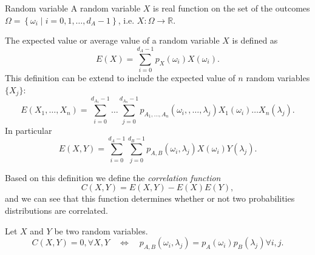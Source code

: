 \begin{Definition}{Random variable}{}
	A random variable $X$ is real function on the set of the outcomes $\Omega = \left\{\omega_i \mid i = 0,1, \ldots , d_A-1\right\}$, i.e. $X \colon \Omega\to \mathbb{R}$.
\end{Definition}
\begin{definition}
	The expected value or average value of a random variable $X$ is defined as
	\begin{equation*}
		E(X) = \sum_{i=0}^{d_A-1} p_X(\omega_i)X(\omega_i).
	\end{equation*}
	This definition can be extend to include the expected value of $n$ random variables $\{X_j\}$:
	\begin{equation*}
		E(X_1, \ldots, X_n) = \sum_{i=0}^{d_{A_1}-1}\ldots \sum_{j=0}^{d_{A_n}-1}p_{A_1, \ldots, A_n}(\omega_{i},, \ldots, \lambda_{j}) X_1(\omega_{i}) \ldots X_n(\lambda_{j}).
	\end{equation*}
	In particular
	\begin{equation*}
		E(X,Y) = \sum_{i=0}^{d_A-1}\sum_{j=0}^{d_B-1}p_{A,B}(\omega_i,\lambda_j)X(\omega_i)Y(\lambda_j).
	\end{equation*}
\end{definition}
\noindent Based on this definition we define the \emph{correlation function}
\begin{equation}
	C(X,Y) = E(X,Y) - E(X)E(Y),
\end{equation}
and we can see that this function determines whether or not two probabilities distributions are correlated.
\begin{proposition}
	Let $X$ and $Y$ be two random variables.
	\[
		C(X,Y) = 0, \forall X,Y\quad \Longleftrightarrow \quad p_{A,B}(\omega_i,\lambda_j) = p_A(\omega_i)p_B(\lambda_j) \forall i,j.
	\]
\end{proposition}
